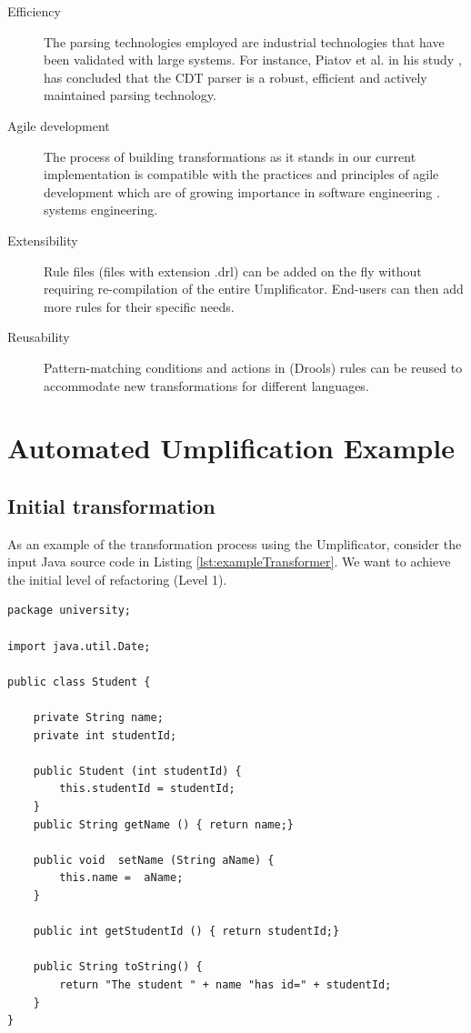\begin{description}
\item [Efficiency] The parsing technologies employed are industrial technologies that have been validated with large systems. For instance, Piatov et al. in his study \cite{CDTPARSER}, has concluded that the CDT parser is a robust, efficient and actively maintained parsing technology. 

\item [Agile development] The process of building transformations as it stands in our current implementation is compatible with the practices and principles of agile development which are of growing importance in software engineering \cite{agileDev}.
systems engineering.

\item [Extensibility] Rule files (files with extension .drl) can be added on the fly without requiring re-compilation of the entire Umplificator. End-users can then add more rules for their specific needs. 

\item [Reusability] Pattern-matching conditions and actions in (Drools) rules can be reused to accommodate new transformations for different languages. 
\end{description}

\section{Automated Umplification Example}
\label{sec:automatedUmplification}
\subsection{Initial transformation}

As an example of the transformation process using the Umplificator, consider the input Java source code in Listing \ref{lst:exampleTransformer}.
We want to achieve the initial level of refactoring (Level 1).

\begin{lstlisting}[style=java, caption=Input source code, label=lst:exampleTransformer]
package university;

import java.util.Date;

public class Student {
	
    private String name;
    private int studentId;
    
    public Student (int studentId) {
    	this.studentId = studentId;
    }
    public String getName () { return name;}
    
    public void  setName (String aName) { 
    	this.name =  aName;
    }
   
    public int getStudentId () { return studentId;}
    
    public String toString() {
    	return "The student " + name "has id=" + studentId;
    }
}   
\end{lstlisting}

